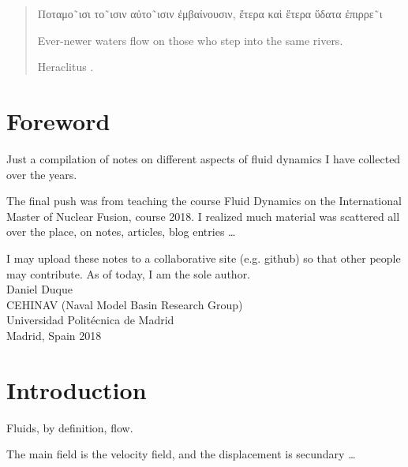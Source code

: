 \chapter*{}

\vspace{6ex}
\begin{quote}
  \greektext

  Ποταμο˜ισι το˜ισιν αὐτο˜ισιν ἐμβαίνουσιν, ἕτερα καὶ ἕτερα ὕδατα ἐπιρρε˜ι  \\%
  \latintext
  \begin{em}
    Ever-newer waters flow on those who step into the same rivers.  \\%
  \end{em}
  Heraclitus \cite{Diels-Kranz}.%
\end{quote}


\newpage

\chapter*{Foreword}


Just a compilation of notes on different aspects of fluid
dynamics I have collected over the years.

The final push was from teaching the course Fluid Dynamics on the
International Master of Nuclear Fusion, course 2018. I realized much
material was scattered all over the place, on notes, articles, blog
entries \ldots

I may upload these notes to a collaborative site (e.g. github) so that
other people may contribute. As of today, I am the sole author.\\[4cm]

Daniel Duque \\
CEHINAV (Naval Model Basin Research Group) \\
Universidad Polit\'ecnica de Madrid \\
Madrid, Spain 2018


\chapter{Introduction}

Fluids, by definition, flow.

The main field is the velocity field, and the displacement is
secundary \ldots


